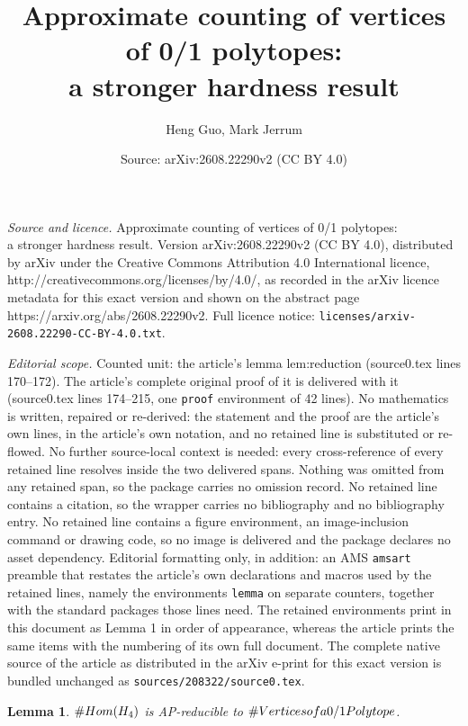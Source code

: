 \documentclass[10pt,a4paper]{amsart}
\title{Approximate counting of vertices of 0/1 polytopes: \\ a stronger hardness result}
\author{Heng Guo, Mark Jerrum}
\date{Source: arXiv:2608.22290v2 (CC BY 4.0)}
\newtheorem{lemma}{Lemma}
\def\Hfour{H_4}
\def\nHom{\textsc{\#Hom}}
\def\nPolytopeVertices{\textsc{\#Vertices of a 0/1 Polytope}}
\begin{document}
\maketitle

\noindent\emph{Source and licence.} Approximate counting of vertices of 0/1 polytopes: \\ a stronger hardness result. Version arXiv:2608.22290v2 (CC BY 4.0), distributed by arXiv under the Creative Commons Attribution 4.0 International licence, http://creativecommons.org/licenses/by/4.0/, as recorded in the arXiv licence metadata for this exact version and shown on the abstract page https://arxiv.org/abs/2608.22290v2. Full licence notice: \texttt{licenses/arxiv-2608.22290-CC-BY-4.0.txt}.\par\smallskip

\noindent\textit{Editorial scope.} Counted unit: the article's lemma lem:reduction (source0.tex lines 170--172). The article's complete original proof of it is delivered with it (source0.tex lines 174--215, one \texttt{proof} environment of 42 lines). No mathematics is written, repaired or re-derived: the statement and the proof are the article's own lines, in the article's own notation, and no retained line is substituted or re-flowed.  No further source-local context is needed: every cross-reference of every retained line resolves inside the two delivered spans.  Nothing was omitted from any retained span, so the package carries no omission record.  No retained line contains a citation, so the wrapper carries no bibliography and no bibliography entry.  No retained line contains a figure environment, an image-inclusion command or drawing code, so no image is delivered and the package declares no asset dependency.  Editorial formatting only, in addition: an AMS \texttt{amsart} preamble that restates the article's own declarations and macros used by the retained lines, namely the environments \texttt{lemma} on separate counters, together with the standard packages those lines need.  The retained environments print in this document as Lemma 1 in order of appearance, whereas the article prints the same items with the numbering of its own full document.  The complete native source of the article as distributed in the arXiv e-print for this exact version is bundled unchanged as \texttt{sources/208322/source0.tex}.
\begin{lemma}\label{lem:reduction}
$\nHom(\Hfour)$ is AP-reducible to $\nPolytopeVertices$.
\end{lemma}
\end{document}
